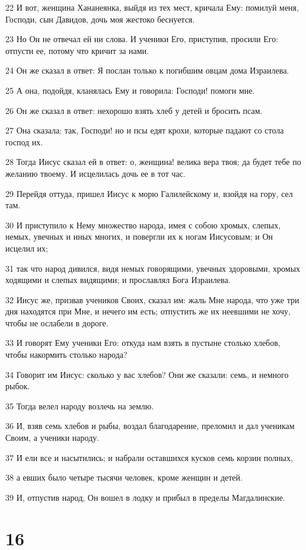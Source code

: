 \par 22 И вот, женщина Хананеянка, выйдя из тех мест, кричала Ему: помилуй меня, Господи, сын Давидов, дочь моя жестоко беснуется.
\par 23 Но Он не отвечал ей ни слова. И ученики Его, приступив, просили Его: отпусти ее, потому что кричит за нами.
\par 24 Он же сказал в ответ: Я послан только к погибшим овцам дома Израилева.
\par 25 А она, подойдя, кланялась Ему и говорила: Господи! помоги мне.
\par 26 Он же сказал в ответ: нехорошо взять хлеб у детей и бросить псам.
\par 27 Она сказала: так, Господи! но и псы едят крохи, которые падают со стола господ их.
\par 28 Тогда Иисус сказал ей в ответ: о, женщина! велика вера твоя; да будет тебе по желанию твоему. И исцелилась дочь ее в тот час.
\par 29 Перейдя оттуда, пришел Иисус к морю Галилейскому и, взойдя на гору, сел там.
\par 30 И приступило к Нему множество народа, имея с собою хромых, слепых, немых, увечных и иных многих, и повергли их к ногам Иисусовым; и Он исцелил их;
\par 31 так что народ дивился, видя немых говорящими, увечных здоровыми, хромых ходящими и слепых видящими; и прославлял Бога Израилева.
\par 32 Иисус же, призвав учеников Своих, сказал им: жаль Мне народа, что уже три дня находятся при Мне, и нечего им есть; отпустить же их неевшими не хочу, чтобы не ослабели в дороге.
\par 33 И говорят Ему ученики Его: откуда нам взять в пустыне столько хлебов, чтобы накормить столько народа?
\par 34 Говорит им Иисус: сколько у вас хлебов? Они же сказали: семь, и немного рыбок.
\par 35 Тогда велел народу возлечь на землю.
\par 36 И, взяв семь хлебов и рыбы, воздал благодарение, преломил и дал ученикам Своим, а ученики народу.
\par 37 И ели все и насытились; и набрали оставшихся кусков семь корзин полных,
\par 38 а евших было четыре тысячи человек, кроме женщин и детей.
\par 39 И, отпустив народ, Он вошел в лодку и прибыл в пределы Магдалинские.

\chapter{16}

